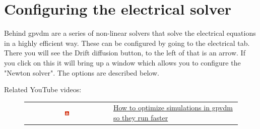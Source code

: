 \newpage
\section{Configuring the electrical solver}
\label{sec:solverconfig}


Behind gpvdm are a series of non-linear solvers that solve the electrical equations in a highly efficient way.  These can be configured by going to the electrical tab. There you will see the Drift diffusion button, to the left of that is an arrow. If you click on this it will bring up a window which allows you to configure the "Newton solver". The options are described below.

Related YouTube videos:
\begin{figure}[H]

\begin{tabular}{ c l }

\includegraphics[width=0.05\textwidth]{./images/youtube.png}

&
\href{https://www.youtube.com/watch?v=D2WG1_wTbdc}{How to optimize simulations in gpvdm so they run faster}

\end{tabular}
\end{figure}

